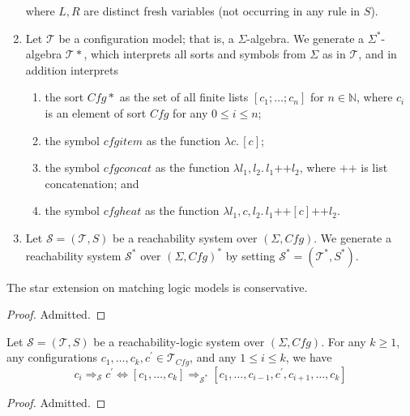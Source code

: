 \documentclass{article}
\newcommand{\Tcfg}{\mathcal{T}_{\mathit{Cfg}}}
\begin{document}
\begin{definition}
\begin{enumerate}
          where $L,R$ are distinct fresh variables (not occurring in any rule in $S$).
    \item Let $\mathcal{T}$ be a configuration model; that is, a $\Sigma$-algebra.
          We generate a $\Sigma^*$-algebra $\mathcal{T}*$, which interprets all sorts and symbols from
          $\Sigma$ as in $\mathcal{T}$, and in addition interprets
          \begin{enumerate}
              \item the sort $\mathit{Cfg}*$ as the set of all finite lists
              $[c_1;\ldots;c_n]$ for $n \in \mathbb{N}$, where $c_i$ is an element of sort $\mathit{Cfg}$
              for any $0 \leq i \leq n$;
              \item the symbol $\mathit{cfgitem}$ as the function $\lambda c.\, [c]$;
              \item the symbol $\mathit{cfgconcat}$ as the function $\lambda l_1,l_2.\, l_1 \texttt{++} l_2$,
                where $\texttt{++}$ is list concatenation; and
              \item the symbol $\mathit{cfgheat}$ as the function
                $\lambda l_1, c, l_2.\, l_1 \texttt{++} [c] \texttt{++} l_2$.
          \end{enumerate}
          
    \item Let $\mathcal{S} = (\mathcal{T}, S)$ be a reachability system over $(\Sigma, \mathit{Cfg})$.
          We generate a reachability system $\mathcal{S}^*$ over $(\Sigma, \mathit{Cfg})^*$
          by setting $\mathcal{S}^* = (\mathcal{T}^*, S^*)$.
\end{enumerate}
\end{definition}

\begin{lemma}
    The star extension on matching logic models is conservative.
\end{lemma}
\begin{proof}
Admitted.
\end{proof}

\begin{lemma}
    Let $\mathcal{S} = (\mathcal{T}, S)$ be a reachability-logic system over $(\Sigma, \mathit{Cfg})$.
    For any $k \geq 1$, any configurations $c_1,\ldots,c_k, c^\prime \in \Tcfg$, and any $1 \leq i \leq k$,
    we have
    \begin{equation*}
        c_i \Rightarrow_{\mathcal{S}} c^\prime
                    \iff
        [c_1,\ldots,c_k] \Rightarrow_{\mathcal{S}^*} [c_1, \ldots, c_{i-1}, c^\prime, c_{i+1}, \ldots, c_k]
    \end{equation*}
\end{lemma}
\begin{proof}
Admitted.
\end{proof}
\end{document}
